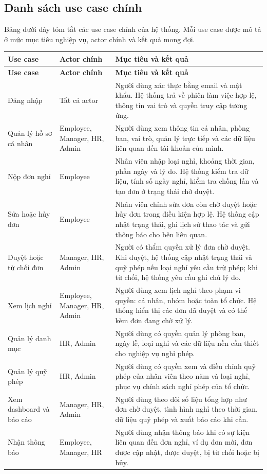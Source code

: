 \subsection{Danh sách use case chính}
Bảng dưới đây tóm tắt các use case chính của hệ thống. Mỗi use case được mô tả ở mức mục tiêu nghiệp vụ, actor chính và kết quả mong đợi.

\begin{longtable}{p{}p{}p{}}
\toprule
\textbf{Use case} & \textbf{Actor chính} & \textbf{Mục tiêu và kết quả} \\
\midrule
\endfirsthead
\toprule
\textbf{Use case} & \textbf{Actor chính} & \textbf{Mục tiêu và kết quả} \\
\midrule
\endhead
Đăng nhập & Tất cả actor & Người dùng xác thực bằng email và mật khẩu. Hệ thống trả về phiên làm việc hợp lệ, thông tin vai trò và quyền truy cập tương ứng. \\
Quản lý hồ sơ cá nhân & Employee, Manager, HR, Admin & Người dùng xem thông tin cá nhân, phòng ban, vai trò, quản lý trực tiếp và các dữ liệu liên quan đến tài khoản của mình. \\
Nộp đơn nghỉ & Employee & Nhân viên nhập loại nghỉ, khoảng thời gian, phần ngày và lý do. Hệ thống kiểm tra dữ liệu, tính số ngày nghỉ, kiểm tra chồng lấn và tạo đơn ở trạng thái chờ duyệt. \\
Sửa hoặc hủy đơn & Employee & Nhân viên chỉnh sửa đơn còn chờ duyệt hoặc hủy đơn trong điều kiện hợp lệ. Hệ thống cập nhật trạng thái, ghi lịch sử thao tác và gửi thông báo cho bên liên quan. \\
Duyệt hoặc từ chối đơn & Manager, HR, Admin & Người có thẩm quyền xử lý đơn chờ duyệt. Khi duyệt, hệ thống cập nhật trạng thái và quỹ phép nếu loại nghỉ yêu cầu trừ phép; khi từ chối, hệ thống yêu cầu ghi chú lý do. \\
Xem lịch nghỉ & Employee, Manager, HR, Admin & Người dùng xem lịch nghỉ theo phạm vi quyền: cá nhân, nhóm hoặc toàn tổ chức. Hệ thống hiển thị các đơn đã duyệt và có thể kèm đơn đang chờ xử lý. \\
Quản lý danh mục & HR, Admin & Người dùng có quyền quản lý phòng ban, ngày lễ, loại nghỉ và các dữ liệu nền cần thiết cho nghiệp vụ nghỉ phép. \\
Quản lý quỹ phép & HR, Admin & Người dùng có quyền xem và điều chỉnh quỹ phép của nhân viên theo năm và loại nghỉ, phục vụ chính sách nghỉ phép của tổ chức. \\
Xem dashboard và báo cáo & Manager, HR, Admin & Người dùng theo dõi số liệu tổng hợp như đơn chờ duyệt, tình hình nghỉ theo thời gian, dữ liệu quỹ phép và xuất báo cáo khi cần. \\
Nhận thông báo & Employee, Manager, HR & Người dùng nhận thông báo khi có sự kiện liên quan đến đơn nghỉ, ví dụ đơn mới, đơn được cập nhật, được duyệt, bị từ chối hoặc bị hủy. \\
\bottomrule
\end{longtable}

